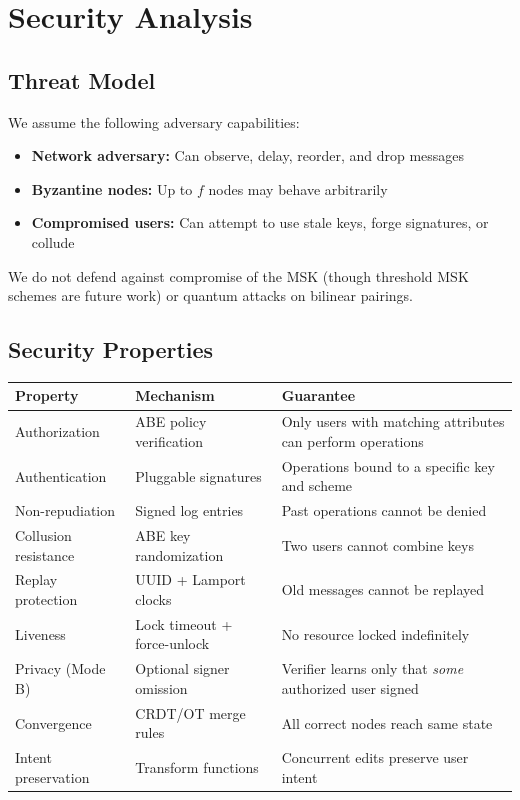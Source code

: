 \documentclass[sigconf,nonacm]{acmart}
\begin{document}
\section{Security Analysis}

\subsection{Threat Model}

We assume the following adversary capabilities:

\begin{itemize}
    \item \textbf{Network adversary:} Can observe, delay, reorder, and drop messages
    \item \textbf{Byzantine nodes:} Up to $f$ nodes may behave arbitrarily
    \item \textbf{Compromised users:} Can attempt to use stale keys, forge signatures, or collude
\end{itemize}

We do not defend against compromise of the MSK (though threshold MSK schemes are future work) or quantum attacks on bilinear pairings.

\subsection{Security Properties}

\vspace{4pt}
\begin{tabularx}{\columnwidth}{l>{\hsize=0.9\hsize}X>{\hsize=1.1\hsize}X}
\toprule
\textbf{Property} & \textbf{Mechanism} & \textbf{Guarantee} \\
\midrule
Authorization & ABE policy verification & Only users with matching attributes can perform operations \\
Authentication & Pluggable signatures & Operations bound to a specific key and scheme \\
Non-repudiation & Signed log entries & Past operations cannot be denied \\
Collusion resistance & ABE key randomization & Two users cannot combine keys \\
Replay protection & UUID + Lamport clocks & Old messages cannot be replayed \\
Liveness & Lock timeout + force-unlock & No resource locked indefinitely \\
Privacy (Mode B) & Optional signer omission & Verifier learns only that \textit{some} authorized user signed \\
Convergence & CRDT/OT merge rules & All correct nodes reach same state \\
Intent preservation & Transform functions & Concurrent edits preserve user intent \\
\bottomrule
\end{tabularx}
\end{document}
